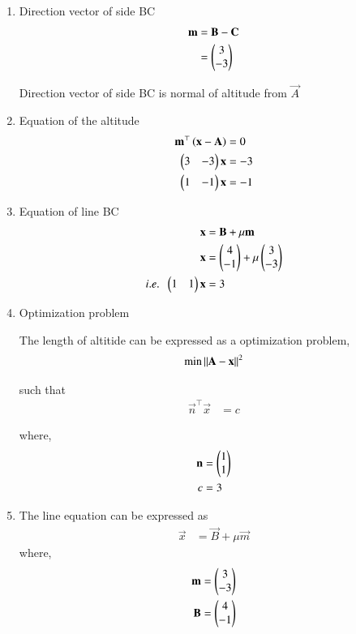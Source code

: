 \documentclass[journal,12pt,twocolumn]{IEEEtran}
\begin{document}
\begin{enumerate}

\item Direction vector of side BC
	\begin{align}
		\mathbf{m} &= \mathbf{B} - \mathbf{C} \\
		&= \begin{pmatrix}3 \\ -3\end{pmatrix} 
	\end{align}

 Direction vector of side BC is normal of altitude from $\vec{A}$

\item Equation of the altitude
	\begin{align}
		\mathbf{m}^{\top} \left(\mathbf{x} - \mathbf{A}\right) &= 0 \\
		\begin{pmatrix}3 & -3\end{pmatrix} \mathbf{x} &=  -3 \\
		\begin{pmatrix}1 & -1\end{pmatrix} \mathbf{x} &=  -1
	\end{align}

\item Equation of line BC
	\begin{align}
		\mathbf{x} &= \mathbf{B} + \mu \mathbf{m}  \\
		\mathbf{x} &= \begin{pmatrix}4 \\ -1\end{pmatrix} + \mu \begin{pmatrix}3 \\ -3\end{pmatrix} \\
		i.e. \; \; \begin{pmatrix}1 & 1\end{pmatrix} \mathbf{x} &=  3
	\end{align}

\item Optimization problem

	The length of altitide can be expressed as a optimization problem,
		\begin{align}
			\text{min} \left\lVert\mathbf{A} - \mathbf{x}\right\rVert^2
		\end{align}

		such that 
		\begin{align}
			\vec{n}^{\top} \vec{x} &=  c
		\end{align}

		where,
		\begin{align}
			\mathbf{n} &= \begin{pmatrix}1\\1\end{pmatrix} \\
			c &= 3
		\end{align}

\item	The line equation can be expressed as
		\begin{align}
			\vec{x} &= \vec{B} + \mu \vec{m}
		\end{align}
	where,
		\begin{align}
			\mathbf{m} &= \begin{pmatrix}3\\-3\end{pmatrix} \\
			\mathbf{B} &= \begin{pmatrix}4\\-1\end{pmatrix}
		\end{align}


\end{enumerate}
\end{document}
